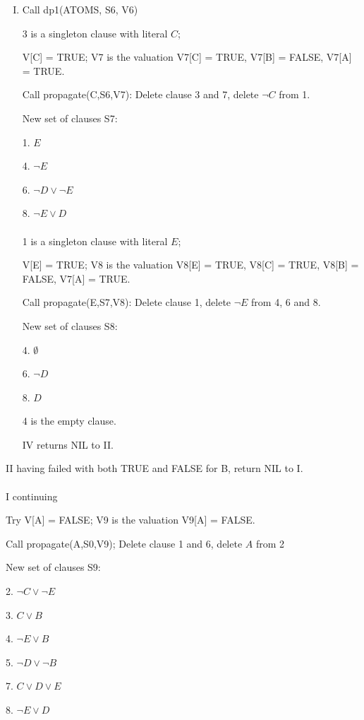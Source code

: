 \documentclass[11pt]{article}
\begin{document}
	\begin{enumerate}[IV.]
		\item Call dp1(ATOMS, S6, V6)
		
		3 is a singleton clause with literal $ C $;
		
		V[C] = TRUE; V7 is the valuation V7[C] = TRUE, V7[B] = FALSE, V7[A] = TRUE.
		
		Call propagate(C,S6,V7): Delete clause 3 and 7, delete $ \neg C $ from 1.
		
		New set of clauses S7:
		
		1. $ E $
		
		4. $ \neg E $
		
		6. $ \neg D\vee \neg E $
		
		8. $ \neg E\vee D $ 
		\\
		\\
		1 is a singleton clause with literal $ E $;
		
		V[E] = TRUE; V8 is the valuation V8[E] = TRUE, V8[C] = TRUE, V8[B] = FALSE, V7[A] = TRUE.
		
		Call propagate(E,S7,V8): Delete clause 1, delete $ \neg E $ from 4, 6 and 8.
		
		New set of clauses S8:
		
		4. $ \emptyset $
		
		6. $ \neg D $
		
		8. $ D $
		
		4 is the empty clause.
		
		IV returns NIL to II.
	\end{enumerate}
	
	II having failed with both TRUE and FALSE for B, return NIL to I.
	\\
	\\
	I continuing
	
	Try V[A] = FALSE; V9 is the valuation V9[A] = FALSE.
	
	Call propagate(A,S0,V9); Delete clause 1 and 6, delete $ A $ from 2
	
	New set of clauses S9:
	
	2. $ \neg C \vee \neg E $
	
	3. $ C\vee B $
	
	4. $ \neg E\vee B $
	
	5. $ \neg D\vee\neg B $
	
	7. $ C\vee D\vee E $
	
	8. $ \neg E\vee D $
	
\end{document}

